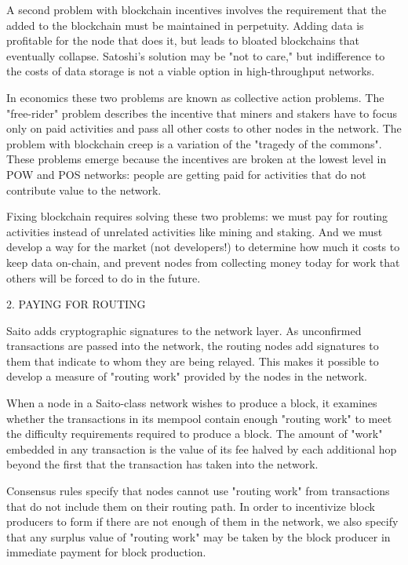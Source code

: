 \documentclass[11.5pt, oneside]{article}   	%
\begin{document}
\begin{multicols}{2}
A second problem with blockchain incentives involves the requirement that the added to the blockchain must be maintained in perpetuity. Adding data is profitable for the node that does it, but leads to bloated blockchains that eventually collapse. Satoshi's solution may be "not to care," but indifference to the costs of data storage is not a viable option in high-throughput networks.

In economics these two problems are known as collective action problems. The "free-rider" problem describes the incentive that miners and stakers have to focus only on paid activities and pass all other costs to other nodes in the network. The problem with blockchain creep is a variation of the "tragedy of the commons". These problems emerge because the incentives are broken at the lowest level in POW and POS networks: people are getting paid for activities that do not contribute value to the network.

Fixing blockchain requires solving these two problems: we must pay for routing activities instead of unrelated activities like mining and staking. And we must develop a way for the market (not developers!) to determine how much it costs to keep data on-chain, and prevent nodes from collecting money today for work that others will be forced to do in the future.

2. PAYING FOR ROUTING

Saito adds cryptographic signatures to the network layer. As unconfirmed transactions are passed into the network, the routing nodes add signatures to them that indicate to whom they are being relayed. This makes it possible to develop a measure of "routing work" provided by the nodes in the network.

When a node in a Saito-class network wishes to produce a block, it examines whether the transactions in its mempool contain enough "routing work" to meet the difficulty requirements required to produce a block. The amount of "work" embedded in any transaction is the value of its fee halved by each additional hop beyond the first that the transaction has taken into the network.

Consensus rules specify that nodes cannot use "routing work" from transactions that do not include them on their routing path. In order to incentivize block producers to form if there are not enough of them in the network, we also specify that any surplus value of "routing work" may be taken by the block producer in immediate payment for block production.


\end{multicols}
\end{document}
